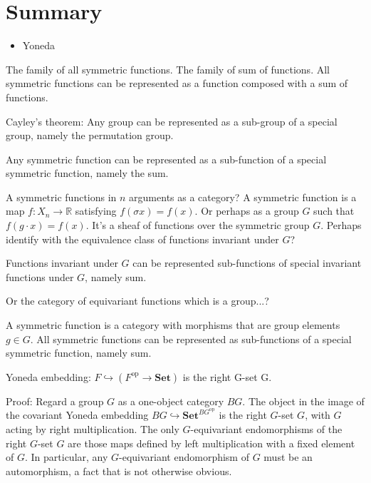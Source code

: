 \maketitle

\section*{Summary}
\begin{itemize}
	\item Yoneda
\end{itemize}


\setcounter{section}{-1}

The family of all symmetric functions.  The family of sum of functions.  All symmetric functions can be represented as a function composed with a sum of functions.

Cayley's theorem:  Any group can be represented as a sub-group of a special group, namely the permutation group.

Any symmetric function can be represented as a sub-function of a special symmetric function, namely the sum.

A symmetric functions in $n$ arguments as a category?  A symmetric function is a map $f: X_n \rightarrow \mathbb{R}$ satisfying $f (\sigma x) = f(x)$.  Or perhaps as a group $G$ such that $f(g \cdot x) = f(x)$.  It's a sheaf of functions over the symmetric group $G$.  Perhaps identify with the equivalence class of functions invariant under $G$?

Functions invariant under $G$ can be represented sub-functions of special invariant functions under $G$, namely sum.

Or the category of equivariant functions which is a group...?

A symmetric function is a category with morphisms that are group elements $g \in G$.  All symmetric functions can be represented as sub-functions of a special symmetric function, namely sum.

Yoneda embedding:  $F \hookrightarrow (F^{\mathrm{op}} \rightarrow \mathbf{Set})$ is the right G-set G.

Proof:  Regard a group $G$ as a one-object category $BG$.  The object in the image of the covariant Yoneda embedding $BG \hookrightarrow \mathbf{Set}^{BG^{\mathrm{op}}}$ is the right $G$-set $G$, with $G$ acting by right multiplication.   The only $G$-equivariant endomorphisms of the right $G$-set $G$ are those maps defined by left multiplication with a fixed element of $G$.  In particular, any $G$-equivariant endomorphism of $G$ must be an automorphism, a fact that is not otherwise obvious.

